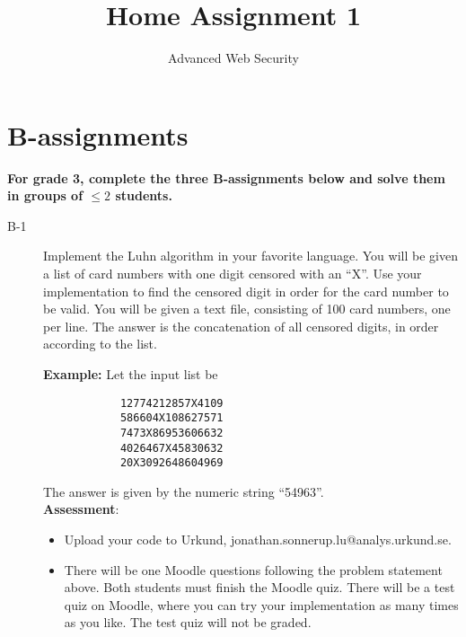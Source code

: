 \documentclass{article}
\begin{document}
	
	\title{Home Assignment 1}
	\author{Advanced Web Security}
	\date{\the\year}
	
	\maketitle
	
	\section*{B-assignments}
	\textbf{For grade 3, complete the three B-assignments below and solve them in groups of $\leq 2$ students.}
	
	\begin{description}
		
		\item[B-1]{Implement the Luhn algorithm in your favorite language. You will be given
			a list of card numbers with one digit censored with an ``X''. Use your implementation to find the
			censored digit in order for the card number to be valid. You will be given a text file,  consisting of 100 card numbers,
			one per line. The answer is the concatenation of all censored digits, 
			in order according to the list.
			
			\textbf{Example:} Let the input list be
			\begin{verbatim}
			12774212857X4109
			586604X108627571
			7473X86953606632
			4026467X45830632
			20X3092648604969
			\end{verbatim}
			The answer is given by the numeric string ``54963''.\\
			\textbf{Assessment}:
			\begin{itemize}
				\item Upload your code to Urkund, jonathan.sonnerup.lu@analys.urkund.se.
				\item There will be one Moodle questions following the problem statement above. Both students must finish the Moodle quiz.	There will be a test quiz on Moodle, where you can try your implementation as many times as you like. The test quiz will not be graded.
			\end{itemize}
		}
		

\end{description}
\end{document}
